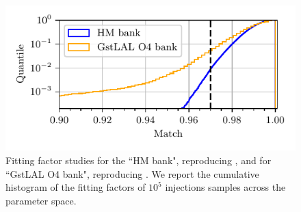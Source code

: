 \documentclass[twocolumn,showpacs,preprintnumbers,nofootinbib,prd,
superscriptaddress,10pt]{revtex4-2}
\begin{document}
\begin{figure}[t]
	\centering
	\includegraphics[scale = 1.]{test_banks_hist}
	\caption{Fitting factor studies for the ``HM bank", reproducing \cite{Harry:2017weg}, and for ``GstLAL O4 bank", reproducing \cite{Sakon:2022ibh}. We report the cumulative histogram of the fitting factors of $10^5$ injections samples across the parameter space.}
	\label{fig:test_banks_hist}
\end{figure}
\end{document}

